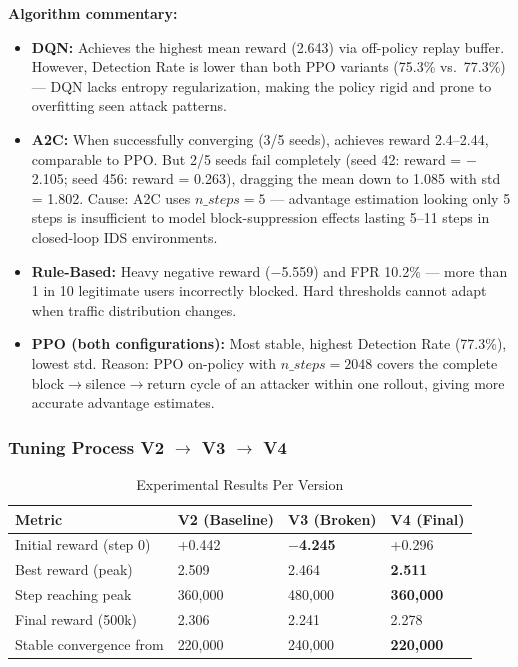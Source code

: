 \documentclass[12pt,a4paper]{report}
\begin{document}
\textbf{Algorithm commentary:}
\begin{itemize}
  \item \textbf{DQN:} Achieves the highest mean reward (2.643) via off-policy replay buffer. However, Detection Rate is lower than both PPO variants (75.3\% vs.\ 77.3\%) --- DQN lacks entropy regularization, making the policy rigid and prone to overfitting seen attack patterns.
  \item \textbf{A2C:} When successfully converging (3/5 seeds), achieves reward 2.4--2.44, comparable to PPO. But 2/5 seeds fail completely (seed 42: reward = $-$2.105; seed 456: reward = 0.263), dragging the mean down to 1.085 with std = 1.802. Cause: A2C uses $n\_steps=5$ --- advantage estimation looking only 5 steps is insufficient to model block-suppression effects lasting 5--11 steps in closed-loop IDS environments.
  \item \textbf{Rule-Based:} Heavy negative reward ($-$5.559) and FPR 10.2\% --- more than 1 in 10 legitimate users incorrectly blocked. Hard thresholds cannot adapt when traffic distribution changes.
  \item \textbf{PPO (both configurations):} Most stable, highest Detection Rate (77.3\%), lowest std. Reason: PPO on-policy with $n\_steps=2048$ covers the complete block$\to$silence$\to$return cycle of an attacker within one rollout, giving more accurate advantage estimates.
\end{itemize}

\subsubsection{Tuning Process V2 $\to$ V3 $\to$ V4}

\begin{table}[h!]
\centering
\caption{Experimental Results Per Version}
\begin{tabular}{L{4cm} C{2.5cm} C{2.5cm} C{2.5cm}}
\toprule
\textbf{Metric} & \textbf{V2 (Baseline)} & \textbf{V3 (Broken)} & \textbf{V4 (Final)} \\
\midrule
Initial reward (step 0) & +0.442 & \textbf{$-$4.245} & +0.296 \\
Best reward (peak) & 2.509 & 2.464 & \textbf{2.511} \\
Step reaching peak & 360,000 & 480,000 & \textbf{360,000} \\
Final reward (500k) & 2.306 & 2.241 & 2.278 \\
Stable convergence from & 220,000 & 240,000 & \textbf{220,000} \\
\bottomrule
\end{tabular}
\end{table}
\end{document}
